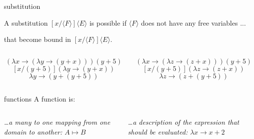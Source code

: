 \begin{frame}{substitution}
  

A substitution $[x/\langle F \rangle]\langle E \rangle$ is possible if
$\langle F \rangle$ does not have any free variables ...
\pause

\vspace{5pt}\hspace{40pt} that become bound in $[x/\langle F \rangle]\langle E \rangle$.

\pause\vspace{20pt}

\begin{columns}
 \begin{column}{0.5\linewidth}
$$(\lambda x \rightarrow (\lambda y \rightarrow  (y + x))) (y + 5)$$
\pause
$$[x/(y + 5)] (\lambda y \rightarrow  (y + x))$$
\pause
$$\lambda y \rightarrow  (y + (y + 5))$$
 \end{column}

\pause
 \begin{column}{0.5\linewidth}
$$(\lambda x \rightarrow (\lambda z \rightarrow  (z + x))) (y + 5)$$
\pause
$$[x/(y + 5)] (\lambda z \rightarrow  (z + x))$$
\pause
$$\lambda z \rightarrow  (z + (y + 5))$$
 \end{column}

\end{columns}

\pause

\vspace{20pt}{\em We have to be careful but renaming variables solves the problem.}


\end{frame}



\begin{frame}{functions}
  A function is:
 \vspace{40pt}
 \begin{columns}[t]
      \begin{column}{0.5\textwidth}
        {\em \ldots a many to one mapping from one domain to another:  $A \mapsto B$ }
      \end{column}
      \begin{column}{0.5\textwidth}
        {\em \ldots a description of the expression that should be evaluated: $\lambda x \rightarrow x + 2$}
      \end{column}
   \end{columns}

\vspace{40pt}{\em In mathematics we can work with functions even if we do not know how to compute them.}


\end{frame}


